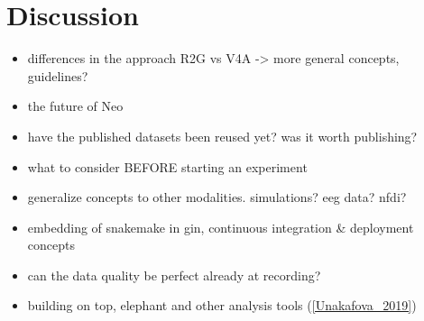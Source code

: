 \clearpage
\section{Discussion}
\label{sec:discussion}

\begin{itemize}
 \item differences in the approach R2G vs V4A -> more general concepts, guidelines?
 \item the future of Neo
 \item have the published datasets been reused yet? was it worth publishing?
 \item what to consider BEFORE starting an experiment
 \item generalize concepts to other modalities. simulations? eeg data? nfdi?
 \item embedding of snakemake in gin, continuous integration & deployment concepts
 \item can the data quality be perfect already at recording?
 \item building on top, elephant and other analysis tools (\ref{Unakafova_2019})
\end{itemize}



% 
% 
% 
